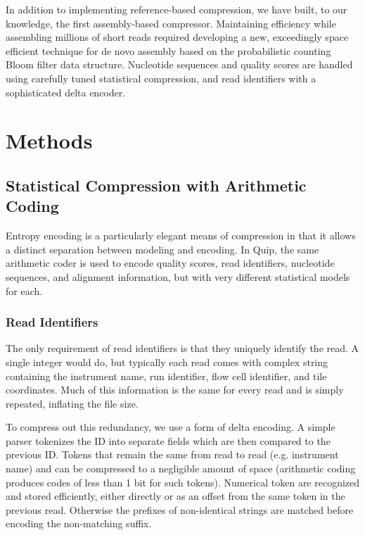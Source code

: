 \documentclass[twocolumn]{article}
\begin{document}
In addition to implementing reference-based compression, we have built, to
our knowledge, the first assembly-based compressor. Maintaining efficiency
while assembling millions of short reads required developing a new,
exceedingly space efficient technique for de novo assembly based on the
probabilistic counting Bloom filter data structure. Nucleotide sequences and
quality scores are handled using carefully tuned statistical compression, and
read identifiers with a sophisticated delta encoder.

\section{Methods}

\subsection{Statistical Compression with Arithmetic Coding}

Entropy encoding is a particularly elegant means of compression in that it
allows a distinct separation between modeling and encoding. In Quip, the same
arithmetic coder is used to encode quality scores, read identifiers,
nucleotide sequences, and alignment information, but with very different
statistical models for each.


\subsubsection{Read Identifiers}

The only requirement of read identifiers is that they uniquely identify the
read. A single integer would do, but typically each read comes with complex
string containing the instrument name, run identifier, flow cell identifier,
and tile coordinates. Much of this information is the same for every read and
is simply repeated, inflating the file size.

To compress out this redundancy, we use a form of delta encoding. A simple
parser tokenizes the ID into separate fields which are then compared to the
previous ID. Tokens that remain the same from read to read (e.g. instrument
name) and can be compressed to a negligible amount of space (arithmetic coding
produces codes of less than 1 bit for such tokens). Numerical token are
recognized and stored efficiently, either directly or as an offset from the
same token in the previous read. Otherwise the prefixes of non-identical
strings are matched before encoding the non-matching suffix.
\end{document}
